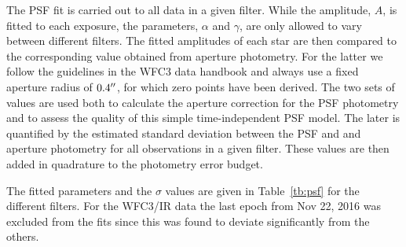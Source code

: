 \documentclass[a4paper,fleqn,usenatbib]{mnras}
\newcommand{\wfc}{WFC3\xspace}
\newcommand{\wfcir}{WFC3/IR\xspace}
\begin{document}
The PSF fit is carried out to all data in a given filter.  While the amplitude, $A$, is fitted to each exposure, the parameters, 
$\alpha$ and $\gamma$, are only allowed to vary between different filters.   The fitted amplitudes of each star are then compared to the 
corresponding value obtained from aperture photometry.  For the latter we follow the guidelines in the \wfc data handbook 
\citep{wfc3handbook} and always use a fixed aperture radius of $0.4\hbox{$^{\prime\prime}$}$, for which zero points have been derived.  
The two sets of values are used both to calculate the aperture correction for the PSF photometry and to assess the quality of this simple 
time-independent PSF model.  The later is quantified by the estimated standard deviation between the PSF and and aperture
photometry for all observations in a given filter.  These values are then added in quadrature to the photometry error budget.

The fitted parameters and the $\sigma$ values are given in Table~\ref{tb:psf} for the different filters.  For the \wfcir data the last 
epoch from Nov 22, 2016 was excluded from the fits since this was found to deviate significantly from the others.

\begin{table}
\centering
\caption{%
   Table of the derived PSF parameters and the estimated standard deviations PSF and aperture photometry 
   for all stars in each given.  Here, the full width at half maximum was calculated as 
   $\mathrm{FWHM} = 2\gamma\left(2^{1/\alpha}-1\right)^{1/2}$. See the text for further details.
  \label{tb:psf}
}

\end{table}

\end{document}
